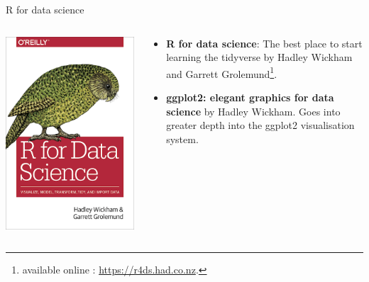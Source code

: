 \begin{frame}{R for data science}
\begin{columns}
    \begin{column}{0.3\textwidth}
\includegraphics{images/cover.png}
    \end{column}
    \begin{column}{0.7\textwidth}
    \begin{Large}
    \begin{itemize}
        \item \textbf{R for data science}: The best place to start learning the tidyverse by Hadley Wickham and Garrett Grolemund\footnote{available online : \url{https://r4ds.had.co.nz}.}.
        \item \textbf{ggplot2: elegant graphics for data science} by Hadley Wickham. Goes into greater depth into the ggplot2 visualisation system.
    \end{itemize}
    \end{Large}
    \end{column}
\end{columns}
\end{frame}